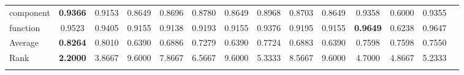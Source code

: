 \documentclass[11pt]{article}
\begin{document}
\begin{threeparttable}
{\begin{tabular}{lccccccccccccc}
component &\textbf{0.9366} &0.9153 &0.8649 &0.8696 &0.8780 &0.8649 &0.8968 &0.8703 &0.8649 &0.9358 &0.6000 &0.9355 &  \\
function &0.9523 &0.9405 &0.9155 &0.9138 &0.9193 &0.9155 &0.9376 &0.9195 &0.9155 &\textbf{0.9649} &0.6238 &0.9647 &  \\
\noalign{\smallskip}\hline\noalign{\smallskip}
Average &\textbf{0.8264} &0.8010 &0.6390 &0.6886 &0.7279 &0.6390 &0.7724 &0.6883 &0.6390 &0.7598 &0.7598 &0.7550 &  \\
Rank &\textbf{2.2000} &3.8667 &9.6000 &7.8667 &6.5667 &9.6000 &5.3333 &8.5667 &9.6000 &4.7000 &4.8667 &5.2333 &  \\
\noalign{\smallskip}\hline\noalign{\smallskip}
\end{tabular}}
\end{threeparttable}
\end{document}
